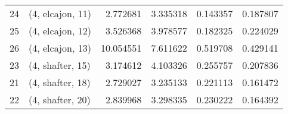 \begin{tabular}{llrrrr}
24 &  (4, elcajon, 11) &   2.772681 &   3.335318 &   0.143357 &  0.187807 \\
25 &  (4, elcajon, 12) &   3.526368 &   3.978577 &   0.182325 &  0.224029 \\
26 &  (4, elcajon, 13) &  10.054551 &   7.611622 &   0.519708 &  0.429141 \\
23 &  (4, shafter, 15) &   3.174612 &   4.103326 &   0.255757 &  0.207836 \\
21 &  (4, shafter, 18) &   2.729027 &   3.235133 &   0.221113 &  0.161472 \\
22 &  (4, shafter, 20) &   2.839968 &   3.298335 &   0.230222 &  0.164392 \\
\bottomrule
\end{tabular}
